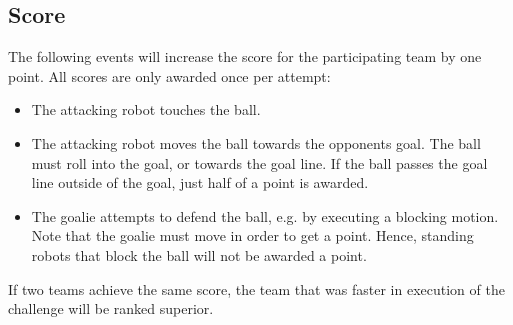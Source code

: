 \documentclass[12pt]{article}
\begin{document}
\subsection{Score}
The following events will increase the score for the participating team by one point. All scores are only awarded once per attempt:

\begin{itemize}
\item The attacking robot touches the ball. 
\item The attacking robot moves the ball towards the opponents goal. The ball must roll into the goal, or towards the goal line. If the ball passes the goal line outside of the goal, just half of a point is awarded.
\item The goalie attempts to defend the ball, e.g. by executing a blocking motion. Note that the goalie must move in order to get a point. Hence, standing robots that block the ball will not be awarded a point.

\end{itemize}
If two teams achieve the same score, the team that was faster in execution of the challenge will be ranked superior.
\end{document}
